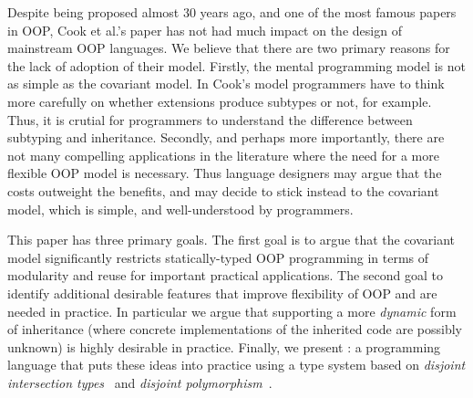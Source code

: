 \begin{comment}
\begin{itemize}

\item {\bf Inheritance and subtyping should be decoupled:} 
That is, there should be different mechanisms for class inheritance 
and class/interface subtyping. 

\item {\bf Extensions do not always produce subtypes:} 
There are cases where classes can inherit from other classes without 
producing subtypes. 

\end{itemize}

\end{comment}

Despite being proposed almost 30 years ago, and one of the most
famous papers in OOP, Cook et al.'s paper has not had much impact 
on the design of mainstream OOP languages.
We believe that there are two primary reasons for the lack of adoption
of their model.  Firstly, the mental programming model is not
as simple as the covariant model. In Cook's model programmers have to
think more carefully on whether extensions produce subtypes or not,
for example.  Thus, it is crutial for programmers to understand the
difference between subtyping and inheritance.
Secondly, and perhaps more importantly, there are not many compelling applications in
the literature where the need for a more flexible OOP model is
necessary. Thus language designers may argue that the costs outweight 
the benefits, and may decide to stick instead to the covariant 
model, which is simple, and well-understood by programmers. 

This paper has three primary goals. The first goal is to argue that the
covariant model significantly restricts statically-typed OOP
programming in terms of modularity and reuse for important practical
applications. The second goal to identify additional desirable
features that improve flexibility of OOP and are needed in practice.
In particular we argue that supporting a more \emph{dynamic}
form of inheritance (where concrete implementations of the inherited
code are possibly unknown) is highly desirable in practice. 
Finally, we present \name: a programming language that puts these 
ideas into practice using a type system based on 
\emph{disjoint intersection types}~\cite{} and \emph{disjoint
polymorphism}~\cite{}.

